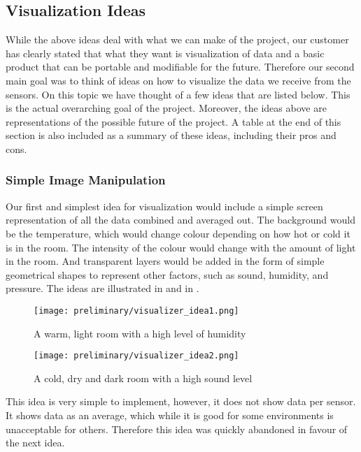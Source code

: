 \documentclass[../document]{subfiles}
\begin{document}
\subsection{Visualization Ideas}
While the above ideas deal with what we can make of the project, our customer has clearly stated that what they want is visualization of data and a basic product that can be portable and modifiable for the future. Therefore our second main goal was to think of ideas on how to visualize the data we receive from the sensors. On this topic we have thought of a few ideas that are listed below. This is the actual overarching goal of the project. Moreover, the ideas above are representations of the possible future of the project. A table at the end of this section is also included as a summary of these ideas, including their pros and cons.

\subsubsection{Simple Image Manipulation}
Our first and simplest idea for visualization would include a simple screen representation of all the data combined and averaged out. The background would be the temperature, which would change colour depending on how hot or cold it is in the room. The intensity of the colour would change with the amount of light in the room. And transparent layers would be added in the form of simple geometrical shapes to represent other factors, such as sound, humidity, and pressure. The ideas are illustrated in   and in .

\begin{figure}[H]
	\texttt{[image: preliminary/visualizer\_idea1.png]}
	\caption{A warm, light room with a high level of humidity}
	\label{fig:visualizer_idea1}
\end{figure}

\begin{figure}[H]
	\texttt{[image: preliminary/visualizer\_idea2.png]}
	\caption{A cold, dry and dark room with a high sound level}
	\label{fig:visualizer_idea2}
\end{figure}

This idea is very simple to implement, however, it does not show data per sensor. It shows data as an average, which while it is good for some environments is unacceptable for others. Therefore this idea was quickly abandoned in favour of the next idea.
\end{document}
